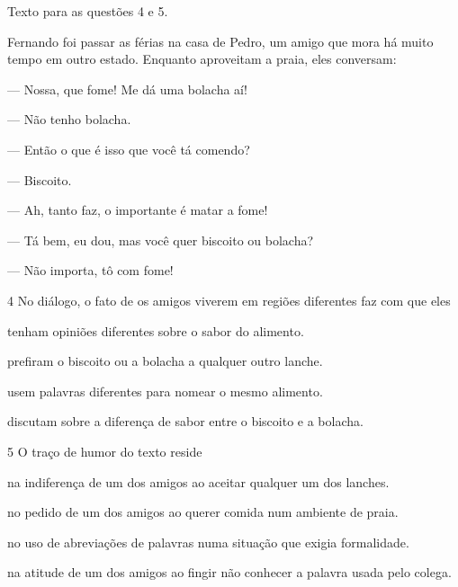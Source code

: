 \noindent Texto para as questões 4 e 5.

\begin{myquote}
Fernando foi passar as férias na casa de Pedro, um amigo que mora há
muito tempo em outro
estado. Enquanto aproveitam a praia, eles conversam:

--- Nossa, que fome! Me dá uma bolacha aí!

--- Não tenho bolacha.

--- Então o que é isso que você tá comendo?

--- Biscoito.

--- Ah, tanto faz, o importante é matar a fome!

--- Tá bem, eu dou, mas você quer biscoito ou bolacha?

--- Não importa, tô com fome!

\end{myquote}

\num{4} No diálogo, o fato de os amigos viverem em regiões diferentes faz com
que eles

\begin{escolha}
\item tenham opiniões diferentes sobre o sabor do alimento.

\item prefiram o biscoito ou a bolacha a qualquer outro lanche.

\item usem palavras diferentes para nomear o mesmo alimento.

\item discutam sobre a diferença de sabor entre o biscoito e a bolacha.
\end{escolha}

\num{5} O traço de humor do texto reside

\begin{escolha}
\item na indiferença de um dos amigos ao aceitar qualquer um dos lanches.

\item no pedido de um dos amigos ao querer comida num ambiente de praia.

\item no uso de abreviações de palavras numa situação que exigia formalidade.

\item na atitude de um dos amigos ao fingir não conhecer a palavra usada pelo colega.
\end{escolha}

